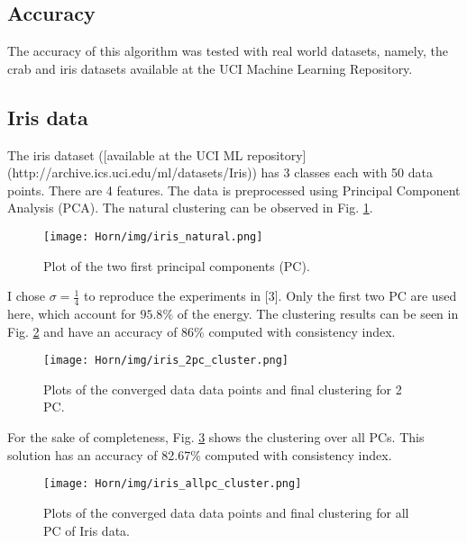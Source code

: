 \subsection{Accuracy}




The accuracy of this algorithm was tested with real world datasets, namely, the crab and iris datasets available at the UCI Machine Learning Repository.


\subsection{Iris data}
\label{sec:horn_iris}
The iris dataset ([available at the UCI ML repository](http://archive.ics.uci.edu/ml/datasets/Iris)) has 3 classes each with 50 data points. There are 4 features. The data is preprocessed using Principal Component Analysis (PCA). The natural clustering can be observed in Fig. \ref{fig:iris_natural}. 


\begin{figure}[hbtp]
\centering
\texttt{[image: Horn/img/iris\_natural.png]}
\caption{Plot of the two first principal components (PC).}
\label{fig:iris_natural}

\end{figure}

I chose $\sigma=\frac{1}{4}$ to reproduce the experiments in [3]. Only the first two PC are used here, which account for $95.8\%$ of the energy. The clustering results can be seen in Fig. \ref{fig:iris_2pc_cluster} and have an accuracy of 86\% computed with consistency index.


\begin{figure}[hbtp]
\centering
\texttt{[image: Horn/img/iris\_2pc\_cluster.png]}
\caption{Plots of the converged data data points and final clustering for 2 PC.}
\label{fig:iris_2pc_cluster}

\end{figure}

For the sake of completeness, Fig. \ref{fig:iris_allpc_cluster} shows the clustering over all PCs. This solution has an accuracy of 82.67\% computed with consistency index.


\begin{figure}[hbtp]
\centering
\texttt{[image: Horn/img/iris\_allpc\_cluster.png]}
\caption{Plots of the converged data data points and final clustering for all PC of Iris data.}
\label{fig:iris_allpc_cluster}
\end{figure}


